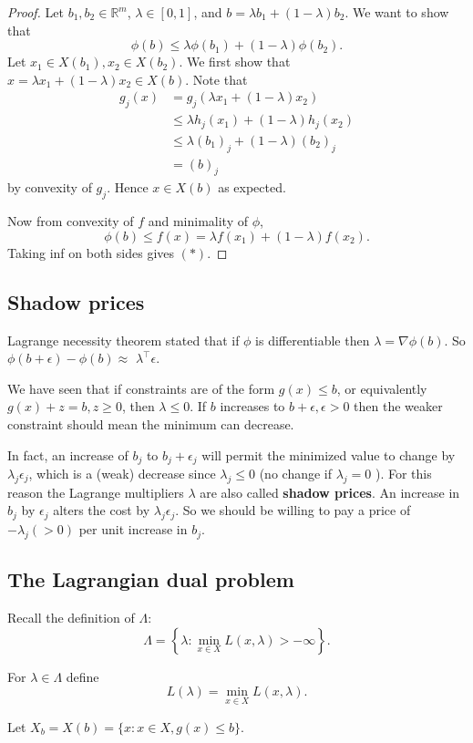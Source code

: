 \begin{proof}
    Let $ b_1,b_2\in \mathbb{R}^{m} $, $ \lambda\in [0,1] $, and $ b = \lambda b_1 + (1-\lambda) b_2 $. We want to show that 
    \[
        \phi(b) \le \lambda \phi(b_1) + (1-\lambda) \phi(b_2). \tag{$*$}
    \]
    Let $ x_1 \in X(b_1),x_2\in X(b_2) $. We first show that $ x = \lambda x_1 + (1-\lambda)x_2\in X(b) $. Note that 
    \begin{align*}
        g_j(x) &= g_j(\lambda x_1 + (1-\lambda) x_2)\\ 
        &\le \lambda h_j(x_1) + (1-\lambda) h_j(x_2) \\ 
        &\le \lambda (b_1)_j + (1-\lambda) (b_2)_j\\ 
        &= (b)_j
    \end{align*}
    by convexity of $g_j$. Hence $x\in X(b)$ as expected. 

    Now from convexity of $f$ and minimality of $\phi$,
    \[
        \phi(b) \le f(x)= \lambda f(x_1) + (1-\lambda) f(x_2). 
    \]
    Taking inf on both sides gives $(*)$.
\end{proof}

\subsection{Shadow prices}
Lagrange necessity theorem stated that if $\phi$ is differentiable then $\lambda=\nabla \phi(b)$. So $\phi(b+\epsilon)-\phi(b) \approx$ $\lambda^{\top} \epsilon$. 

We have seen that if constraints are of the form $g(x) \le b$, or equivalently $g(x)+z=b, z \geq 0$, then $\lambda \leq 0$. If $b$ increases to $b+\epsilon, \epsilon>0$ then the weaker constraint should mean the minimum can decrease. 

In fact, an increase of $b_j$ to $b_j+\epsilon_j$ will permit the minimized value to change by $\lambda_j \epsilon_j$, which is a (weak) decrease since $\lambda_j \leq 0$ (no change if $\lambda_j=0$ ). For this reason the Lagrange multipliers $ \lambda $ are also called \textbf{shadow prices}. An increase in $b_j$ by $\epsilon_j$ alters the cost by $\lambda_j \epsilon_j$. So we should be willing to pay a price of $-\lambda_j(>0)$ per unit increase in $b_j$.

\subsection{The Lagrangian dual problem}
Recall the definition of $\Lambda$: 
\[
    \Lambda = \left\{ \lambda: \min_{x\in X}L(x,\lambda)>-\infty  \right\}.
\]
\begin{definition}
    For $\lambda \in \Lambda$ define
    \[
    L(\lambda)=\min _{x \in X} L(x, \lambda) .
    \]
\end{definition}
Let $X_b=X(b)=\{x: x \in X, g(x) \leq b\}$.

